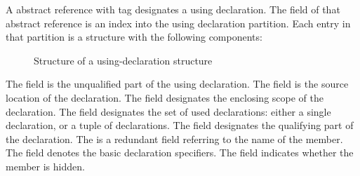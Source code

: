 A  abstract reference with tag  designates a using declaration.
The  field of that abstract reference is an index into the using declaration partition.
Each entry in that partition is a structure with the following components:
%
\begin{figure}[H]
	\centering
	\caption{Structure of a using-declaration structure}
	\label{fig:ifc-using-declaration-structure}
\end{figure}
%

The  field is the unqualified part of the using declaration.
The  field is the source location of the declaration.
The  field designates the enclosing scope of the declaration.
The  field designates the set of used declarations: either a single declaration, or a tuple of declarations.
The  field designates the qualifying part of the declaration.
The  is a redundant field referring to the name of the member.
The  field denotes the basic declaration specifiers.
The  field indicates whether the member is hidden.




\subsection{}
\label{sec:ifc:DeclSort:Unused0}


